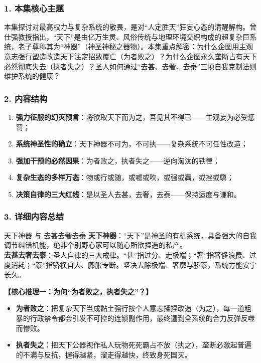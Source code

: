 \subsubsection{1. 本集核心主题}
本集探讨对最高权力与复杂系统的敬畏，是对“人定胜天”狂妄心态的清醒解构。曾仕强教授指出，“天下”是由亿万生灵、风俗传统与地理环境交织构成的超复杂巨系统，老子尊称其为“神器”（神圣神秘之器物）。本集重点解密：为什么企图用主观意志强行塑造改造天下注定招致覆亡（为者败之）？为什么企图永久垄断占有天下必然彻底失去（执者失之）？圣人如何通过“去甚、去奢、去泰”三项自我克制法则维护系统的健康？

\subsubsection{2. 内容结构}
\begin{enumerate}
    \item \textbf{强力征服的幻灭预言}：将欲取天下而为之，吾见其不得已——主观妄为必受惩罚；
    \item \textbf{系统神圣性的确立}：天下神器不可为，不可执——复杂系统不可任性改造；
    \item \textbf{强加干预的必然因果}：为者败之，执者失之——逆向淘汰的铁律；
    \item \textbf{复杂生态的多样万态}：物或行或随，或嘘或吹，或强或羸，或挫或隳；
    \item \textbf{决策自律的三大红线}：是以圣人去甚，去奢，去泰——保持适度与谦和。
\end{enumerate}

\subsubsection{3. 详细内容总结}

\begin{ConceptBox}{天下神器 与 去甚去奢去泰}
\textbf{天下神器}：“天下”是神圣的有机系统，具备强大的自我调节纠错机能，绝非个别野心家可以随心所欲捏造的私产。\\
\textbf{去甚去奢去泰}：圣人自律的三大戒律。“甚”指过分、走极端；“奢”指奢侈浪费、过度消耗；“泰”指骄横自大、膨胀专断。坚决去除极端、奢靡与骄泰，系统方能安宁长久。
\end{ConceptBox}

\noindent\textbf{【核心推理一：为何“为者败之，执者失之”？】}
\begin{itemize}
    \item \textbf{为者败之}：把复杂天下当成黏土强行按个人意志揉捏改造（为之），每一道粗暴的行政禁令都会引发不可控的连锁副作用，最终遭到全系统的合力反弹反噬而惨败。
    \item \textbf{执者失之}：把天下公器视作私人玩物死死霸占不放（执之），垄断必激起普遍的不满与反抗，握得越紧，溜走得越快，终致身死国灭。
\end{itemize}

